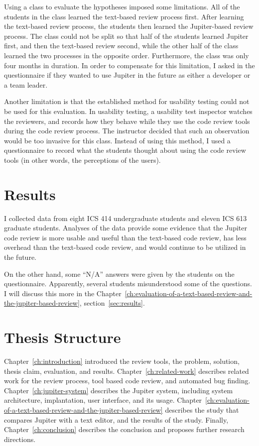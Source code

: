 Using a class to evaluate the hypotheses imposed some limitations. All of the students in the class learned the text-based review process first.  After learning the text-based review process, the students then learned the Jupiter-based review process. The class could not be split so that half of the students learned Jupiter first, and then the text-based review second, while the other half of the class learned the two processes in the opposite order. Furthermore, the class was only four months in duration. In order to compensate for this limitation, I asked in the questionnaire if they wanted to use Jupiter in the future as either a developer or a team leader.

Another limitation is that the established method for usability testing could not be used for this evaluation. In usability testing, a usability test inspector watches the reviewers, and records how they behave while they use the code review tools during the code review process. The instructor decided that such an observation would be too invasive for this class. Instead of using this method, I used a questionnaire to record what the students thought about using the code review tools (in other words, the perceptions of the users).

\section{Results}
\label{sec:intro-results}

I collected data from eight ICS 414 undergraduate students and eleven ICS 613 graduate students. Analyses of the data provide some evidence that the Jupiter code review is more usable and useful than the text-based code review, has less overhead than the text-based code review, and would continue to be utilized in the future.

On the other hand, some ``N/A'' answers were given by the students on the questionnaire. Apparently, several students misunderstood some of the questions. I will discuss this more in the Chapter~\ref{ch:evaluation-of-a-text-based-review-and-the-jupiter-based-review}, section~\ref{sec:results}.

\section{Thesis Structure}
\label{sec:thesis-structure}

Chapter~\ref{ch:introduction} introduced the review tools, the problem, solution, thesis claim, evaluation, and results. Chapter~\ref{ch:related-work} describes related work for the review process, tool based code review, and automated bug finding. Chapter~\ref{ch:jupiter-system} describes the Jupiter system, including system architecture, implantation, user interface, and its usage. Chapter~\ref{ch:evaluation-of-a-text-based-review-and-the-jupiter-based-review} describes the study that compares Jupiter with a text editor, and the results of the study. Finally, Chapter~\ref{ch:conclusion} describes the conclusion and proposes further research directions. 

